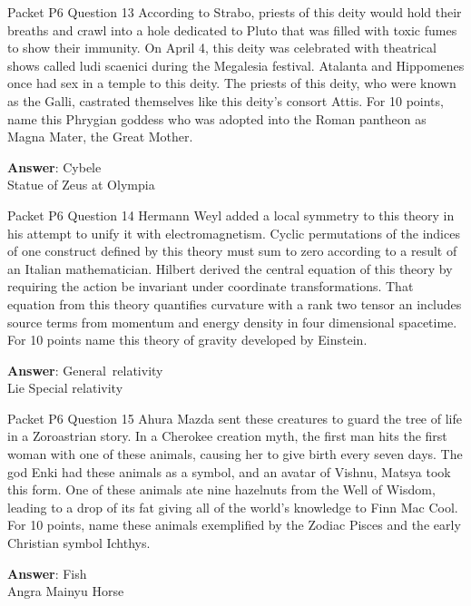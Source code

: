 \begin{frame}{Packet P6 Question 13}
According to Strabo, priests   of this deity would hold their breaths and crawl into a hole dedicated to Pluto that was filled with toxic fumes to show their immunity. On April 4, this deity was celebrated with theatrical shows called ludi scaenici during the Megalesia   festival. Atalanta   and Hippomenes once had sex in a temple   to this deity.   The priests of this deity, who were known as the Galli, castrated themselves like this deity’s consort Attis. For 10 points, name this Phrygian goddess who was adopted into the Roman pantheon as Magna Mater, the Great Mother.

\textbf{Answer}: Cybele\\
 Statue of Zeus at Olympia
\end{frame}

\begin{frame}{Packet P6 Question 14}
Hermann Weyl added a local symmetry to this theory in his attempt   to unify it with electromagnetism. Cyclic permutations of the indices of one construct defined by this theory must sum to zero according to a result of an Italian mathematician. Hilbert derived the central equation of this theory by requiring the action be invariant under coordinate transformations.   That equation from this theory quantifies curvature with a rank two tensor   an includes source terms from momentum and energy density in four dimensional spacetime. For 10 points   name this theory   of gravity developed by Einstein.

\textbf{Answer}: General\ relativity\\
 Lie
 Special relativity
\end{frame}

\begin{frame}{Packet P6 Question 15}
Ahura Mazda sent these   creatures to guard the tree of life in a Zoroastrian story. In a Cherokee creation myth, the first man hits the first woman with one of these animals, causing her to give birth every seven days. The god Enki had these animals as a symbol, and an avatar of Vishnu, Matsya took this form. One of these animals ate nine hazelnuts from the Well   of Wisdom, leading   to a drop of its fat giving all of the world's knowledge to Finn Mac Cool. For   10 points, name these animals exemplified by the Zodiac Pisces and the early Christian symbol Ichthys.  

\textbf{Answer}: Fish\\
 Angra Mainyu
 Horse
\end{frame}

